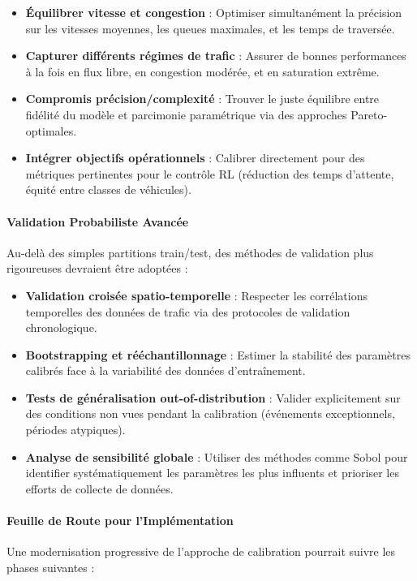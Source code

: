 \begin{itemize}
    \item \textbf{Équilibrer vitesse et congestion} : Optimiser simultanément la précision sur les vitesses moyennes, les queues maximales, et les temps de traversée.
    \item \textbf{Capturer différents régimes de trafic} : Assurer de bonnes performances à la fois en flux libre, en congestion modérée, et en saturation extrême.
    \item \textbf{Compromis précision/complexité} : Trouver le juste équilibre entre fidélité du modèle et parcimonie paramétrique via des approches Pareto-optimales.
    \item \textbf{Intégrer objectifs opérationnels} : Calibrer directement pour des métriques pertinentes pour le contrôle RL (réduction des temps d'attente, équité entre classes de véhicules).
\end{itemize}

\paragraph{Validation Probabiliste Avancée}
Au-delà des simples partitions train/test, des méthodes de validation plus rigoureuses devraient être adoptées :

\begin{itemize}
    \item \textbf{Validation croisée spatio-temporelle} : Respecter les corrélations temporelles des données de trafic via des protocoles de validation chronologique.
    \item \textbf{Bootstrapping et rééchantillonnage} : Estimer la stabilité des paramètres calibrés face à la variabilité des données d'entraînement.
    \item \textbf{Tests de généralisation out-of-distribution} : Valider explicitement sur des conditions non vues pendant la calibration (événements exceptionnels, périodes atypiques).
    \item \textbf{Analyse de sensibilité globale} : Utiliser des méthodes comme Sobol pour identifier systématiquement les paramètres les plus influents et prioriser les efforts de collecte de données.
\end{itemize}

\paragraph{Feuille de Route pour l'Implémentation}
Une modernisation progressive de l'approche de calibration pourrait suivre les phases suivantes :

